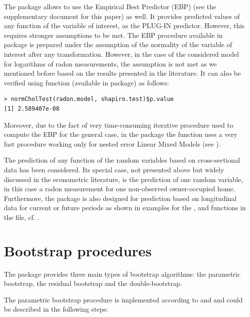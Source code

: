 The  package allows to use the Empirical Best Predictor (EBP) (see the supplementary document for this paper) as well.  It provides predicted values of any function of the variable of interest, as the PLUG-IN predictor. However, this requires stronger assumptions to be met. The EBP procedure available in  package is prepared under the assumption of the normality of the variable of interest after any transformation. However, in the case of the considered model for logarithms of radon measurements, the assumption is not met as we mentioned before based on the results presented in the literature. It can also be verified using  function (available in  package) as follows:
\begin{verbatim}
> normCholTest(radon.model, shapiro.test)$p.value
[1] 2.589407e-08
\end{verbatim}
Moreover, due to the fact of very time-consuming iterative procedure used to compute the EBP for the general case, in the  package the function  uses a very fast procedure working only for nested error Linear Mixed Models (see \cite{molina2010small}).

The prediction of any function of the random variables based on cross-sectional data has been considered. Its special case, not presented above but widely discussed in the econometric literature, is the prediction of one random variable, in this case a radon measurement for one non-observed owner-occupied home. Furthermore, the  package is also designed for prediction based on longitudinal data for current or future periods as shown in examples for the ,  and  functions in the  file, cf. \cite{qape}.

\section{Bootstrap procedures}

The  package provides three main types of bootstrap algorithms: the parametric bootstrap, the residual bootstrap and the double-bootstrap.

The parametric bootstrap procedure is implemented according to \cite{gonzales2007} and \cite{gonzales2008} and could be described in the following steps:

